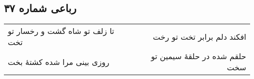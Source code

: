 \begin{center}
\section*{رباعی شماره ۳۷}
\label{sec:sh037}
\begin{longtable}{l p{0.5cm} r}
تا زلف تو شاه گشت و رخسار تو تخت
&&
افکند دلم برابر تخت تو رخت
\\
روزی بینی مرا شده کشتهٔ بخت
&&
حلقم شده در حلقهٔ سیمین تو سخت
\\
\end{longtable}
\end{center}
